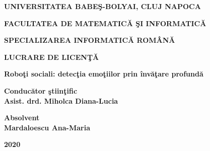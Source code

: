 \documentclass[runningheads,a4paper,12pt]{report}
\begin{document}
\begin{titlepage}
\sloppy
\begin{center}
\Large \textbf{UNIVERSITATEA BABE\c S-BOLYAI, CLUJ NAPOCA}

\Large \textbf{FACULTATEA DE MATEMATIC\u A \c SI INFORMATIC\u A}

\Large \textbf{SPECIALIZAREA INFORMATIC\u A ROM\^ AN\u A}

\vspace{4cm}

\LARGE \textbf{LUCRARE DE LICEN\c T\u A}

\vspace{0.5cm}

\LARGE \textbf {Robo\c ti sociali: detec\c tia emo\c tiilor   prin \^ inv\u a\c tare profund\u a}

\end{center}

\vspace{3cm}

\begin{flushleft}
\LARGE{\textbf{Conduc\u ator \c stiin\c tific}}\\
\LARGE{\textbf{Asist. drd. Miholca Diana-Lucia}}
\end{flushleft}

\vspace{0.3cm}

\begin{flushright}
\LARGE{\textbf{Absolvent}}\\
\LARGE{\textbf{Mardaloescu Ana-Maria}}
\end{flushright}

\vspace{3cm}

\begin{center}
\LARGE{\textbf{2020}}
\end{center}

\newpage

\end{titlepage}
\end{document}

